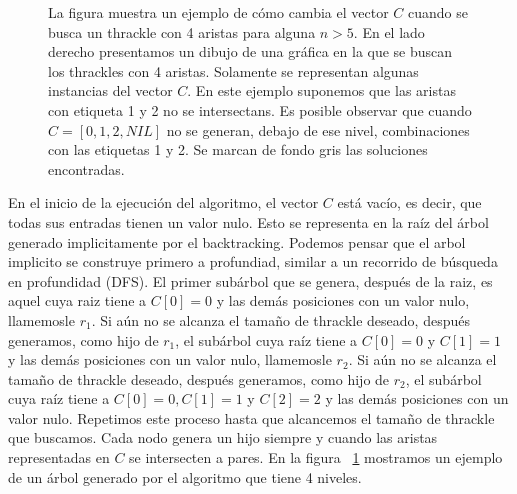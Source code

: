 \begin{figure}[p]
    \caption{La figura muestra un ejemplo de cómo cambia el vector $C$ cuando se busca un thrackle
    con 4 aristas para alguna $n>5$. En el lado derecho presentamos un dibujo de una gráfica en la
    que se buscan los thrackles con 4 aristas. Solamente se representan algunas instancias del
    vector $C$. En este ejemplo suponemos que las aristas con etiqueta 1 y 2 no se
    intersectans. Es posible observar que cuando $C=[0,1,2,NIL]$ no se generan, debajo de ese nivel,
    combinaciones con las etiquetas 1 y 2. Se marcan de fondo gris las soluciones encontradas.
    }
    \label{fig:ejemplo_backtracking}
  \end{figure}
  En el  inicio de la ejecución del algoritmo, el vector $C$ está vacío, es
  decir, que  todas sus entradas tienen un valor nulo. Esto se representa en
  la raíz del árbol generado implicitamente por el backtracking. Podemos pensar que el
  arbol implicito se construye primero a profundiad, similar a un recorrido de búsqueda
  en profundidad (DFS). El primer subárbol que se genera, después de la raiz, es aquel
  cuya raiz tiene a $C[0]=0$ y las demás posiciones con un valor nulo, llamemosle $r_1$.
  Si aún no se alcanza el tamaño de thrackle deseado, después generamos, como hijo de
  $r_1$, el subárbol cuya raíz tiene a $C[0]=0$ y $C[1]=1$ y las demás posiciones con un
  valor nulo, llamemosle $r_2$. Si aún no se alcanza el tamaño de thrackle deseado,
  después generamos, como hijo de $r_2$, el subárbol cuya raíz tiene a $C[0]=0,C[1]=1$ y
  $C[2]=2$ y las demás posiciones con un valor nulo. Repetimos este proceso hasta que
  alcancemos el tamaño de thrackle que buscamos. Cada nodo genera un hijo siempre y
  cuando las aristas representadas en $C$ se intersecten a pares. En la figura
  ~\ref{fig:ejemplo_backtracking} mostramos un ejemplo de un árbol generado por el
  algoritmo que tiene 4 niveles.

